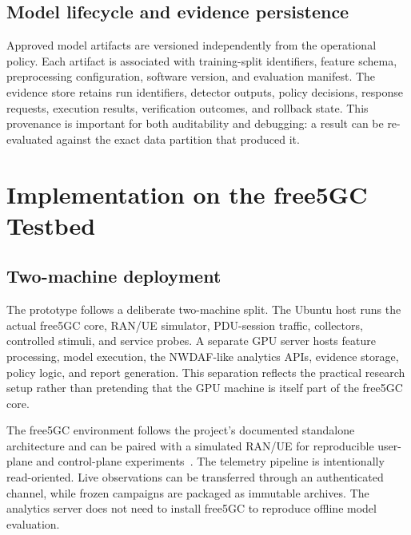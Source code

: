 \documentclass[sigconf,review]{acmart}
\begin{document}
\subsection{Model lifecycle and evidence persistence}
Approved model artifacts are versioned independently from the operational policy. Each artifact is associated with training-split identifiers, feature schema, preprocessing configuration, software version, and evaluation manifest. The evidence store retains run identifiers, detector outputs, policy decisions, response requests, execution results, verification outcomes, and rollback state. This provenance is important for both auditability and debugging: a result can be re-evaluated against the exact data partition that produced it.

\section{Implementation on the free5GC Testbed}
\subsection{Two-machine deployment}
The prototype follows a deliberate two-machine split. The Ubuntu host runs the actual free5GC core, RAN/UE simulator, PDU-session traffic, collectors, controlled stimuli, and service probes. A separate GPU server hosts feature processing, model execution, the NWDAF-like analytics APIs, evidence storage, policy logic, and report generation. This separation reflects the practical research setup rather than pretending that the GPU machine is itself part of the free5GC core.

The free5GC environment follows the project's documented standalone architecture and can be paired with a simulated RAN/UE for reproducible user-plane and control-plane experiments~\cite{free5gcdocs,free5gcueransim}. The telemetry pipeline is intentionally read-oriented. Live observations can be transferred through an authenticated channel, while frozen campaigns are packaged as immutable archives. The analytics server does not need to install free5GC to reproduce offline model evaluation.
\end{document}
